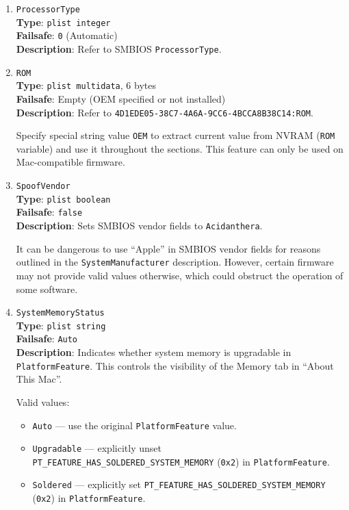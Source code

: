 \documentclass[]{article}
\providecommand{\tightlist}{%
  \setlength{\itemsep}{0pt}\setlength{\parskip}{0pt}}
\begin{document}
\begin{enumerate}
\item
  \texttt{ProcessorType}\\
  \textbf{Type}: \texttt{plist\ integer}\\
  \textbf{Failsafe}: \texttt{0} (Automatic)\\
  \textbf{Description}: Refer to SMBIOS \texttt{ProcessorType}.

\item
  \texttt{ROM}\\
  \textbf{Type}: \texttt{plist\ multidata}, 6 bytes\\
  \textbf{Failsafe}: Empty (OEM specified or not installed)\\
  \textbf{Description}: Refer to
  \texttt{4D1EDE05-38C7-4A6A-9CC6-4BCCA8B38C14:ROM}.

  Specify special string value \texttt{OEM} to extract current value from NVRAM
  (\texttt{ROM} variable) and use it throughout the sections.
  This feature can only be used on Mac-compatible firmware.

\item
  \texttt{SpoofVendor}\\
  \textbf{Type}: \texttt{plist\ boolean}\\
  \textbf{Failsafe}: \texttt{false}\\
  \textbf{Description}: Sets SMBIOS vendor fields to \texttt{Acidanthera}.

  It can be dangerous to use ``Apple'' in SMBIOS vendor fields for reasons outlined in the
  \texttt{SystemManufacturer} description. However, certain firmware may not provide
  valid values otherwise, which could obstruct the operation of some software.

\item
  \texttt{SystemMemoryStatus}\\
  \textbf{Type}: \texttt{plist\ string}\\
  \textbf{Failsafe}: \texttt{Auto}\\
  \textbf{Description}: Indicates whether system memory is upgradable in \texttt{PlatformFeature}.
  This controls the visibility of the Memory tab in ``About This Mac''.

  Valid values:

  \begin{itemize}
    \tightlist
    \item \texttt{Auto} --- use the original \texttt{PlatformFeature} value.
    \item \texttt{Upgradable} --- explicitly unset \texttt{PT\_FEATURE\_HAS\_SOLDERED\_SYSTEM\_MEMORY}
    (\texttt{0x2}) in \texttt{PlatformFeature}.
    \item \texttt{Soldered} --- explicitly set \texttt{PT\_FEATURE\_HAS\_SOLDERED\_SYSTEM\_MEMORY}
    (\texttt{0x2}) in \texttt{PlatformFeature}.
  \end{itemize}


\end{enumerate}
\end{document}
